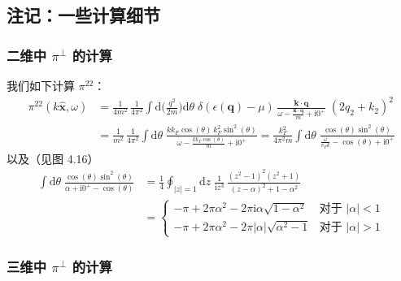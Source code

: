 
\subsection{注记：一些计算细节}

\subsubsection{二维中 $\pi^{\perp}$ 的计算}

我们如下计算 $\pi^{22}$：
\begin{align*}
\pi^{22}(k\hat{\pmb{x}},\omega)
&= \frac{1}{4m^{2}}\, \frac{1}{4\pi^{2}} \int \mathrm{d}\Big(\frac{q^{2}}{2m}\Big) \mathrm{d}\theta\;
\delta(\epsilon(\pmb{q}) - \mu)\, \frac{\pmb{k}\cdot\pmb{q}}{\omega - \frac{\pmb{k}\cdot\pmb{q}}{m} + \mathrm{i}0^{+}}\; (2q_{2} + k_{2})^{2}\\
&= \frac{1}{m^{2}}\, \frac{1}{4\pi^{2}} \int \mathrm{d}\theta\;
\frac{k k_{F} \cos(\theta)\, k_{F}^{2} \sin^{2}(\theta)}{\omega - \frac{k k_{F}\cos(\theta)}{m} + \mathrm{i}0^{+}}
= \frac{k_{F}^{2}}{4\pi^{2} m} \int \mathrm{d}\theta\;
\frac{\cos(\theta) \sin^{2}(\theta)}{\frac{\omega}{v_{F} k} - \cos(\theta) + \mathrm{i}0^{+}}
\end{align*}
以及（见图 4.16）
\begin{align*}
\int \mathrm{d}\theta\; \frac{\cos(\theta) \sin^{2}(\theta)}{\alpha + \mathrm{i}0^{+} - \cos(\theta)}
&= \frac{1}{4} \oint_{|z|=1} \mathrm{d}z\; \frac{1}{\mathrm{i} z^{3}}\, \frac{(z^{2}-1)^{2}(z^{2}+1)}{(z-\alpha)^{2} + 1 - \alpha^{2}}\\
&= \left\{
\begin{array}{ll}
-\pi + 2\pi\alpha^{2} - 2\pi \mathrm{i} \alpha \sqrt{1-\alpha^{2}} & \text{对于 } |\alpha| < 1\\
-\pi + 2\pi\alpha^{2} - 2\pi |\alpha| \sqrt{\alpha^{2}-1} & \text{对于 } |\alpha| > 1
\end{array} \right.
\end{align*}

\subsubsection{三维中 $\pi^{\perp}$ 的计算}

